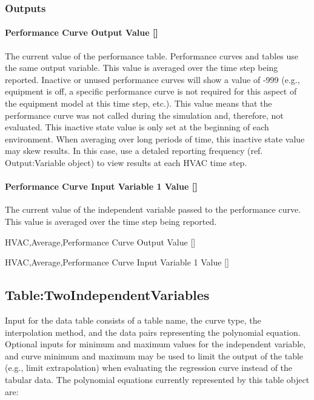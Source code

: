 \subsubsection{Outputs}\label{outputs-022}

\paragraph{Performance Curve Output Value {[]}}\label{performance-curve-output-value-000}

The current value of the performance table. Performance curves and tables use the same output variable. This value is averaged over the time step being reported. Inactive or unused performance curves will show a value of -999 (e.g., equipment is off, a specific performance curve is not required for this aspect of the equipment model at this time step, etc.). This value means that the performance curve was not called during the simulation and, therefore, not evaluated. This inactive state value is only set at the beginning of each environment. When averaging over long periods of time, this inactive state value may skew results. In this case, use a detaled reporting frequency (ref. Output:Variable object) to view results at each HVAC time step.

\paragraph{Performance Curve Input Variable 1 Value {[]}}\label{performance-curve-input-variable-1-value}

The current value of the independent variable passed to the performance curve. This value is averaged over the time step being reported.

HVAC,Average,Performance Curve Output Value {[]}

HVAC,Average,Performance Curve Input Variable 1 Value {[]}

\subsection{Table:TwoIndependentVariables}\label{tabletwoindependentvariables}

Input for the data table consists of a table name, the curve type, the interpolation method, and the data pairs representing the polynomial equation. Optional inputs for minimum and maximum values for the independent variable, and curve minimum and maximum may be used to limit the output of the table (e.g., limit extrapolation) when evaluating the regression curve instead of the tabular data. The polynomial equations currently represented by this table object are:


